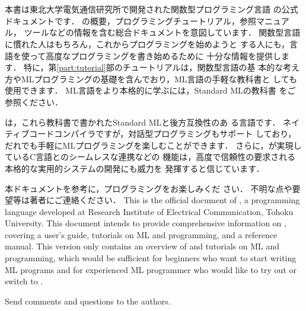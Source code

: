 \part{}
\label{part:outline}

\chapter{}

\ifjp%
	本書は東北大学電気通信研究所で開発された関数型プログラミング言語
\smlsharp{}の公式ドキュメントです．
	\smlsharp{}の概要，プログラミングチュートリアル，参照マニュアル，
ツールなどの情報を含む総合ドキュメントを意図しています．
	関数型言語に慣れた人はもちろん，これからプログラミングを始めようと
する人にも，\smlsharp{}言語を使って高度なプログラミングを書き始めるために
十分な情報を提供します．
	特に，第\ref{part:tutorial}部のチュートリアルは，関数型言語の基
本的な考え方やMLプログラミングの基礎を含んでおり，ML言語の手軽な教科書と
しても使用できます．
	ML言語をより本格的に学ぶには，Standard MLの教科書
\cite{ohori00sml}をご参照ください．
  
	\smlsharp{}は，これら教科書で書かれたStandard MLと後方互換性のあ
る言語です．
	ネイティブコードコンパイラですが，対話型プログラミングもサポート
しており，だれでも手軽にMLプログラミングを楽しむことができます．
	さらに，\smlsharp{}が実現しているC言語とのシームレスな連携などの
機能は，高度で信頼性の要求される本格的な実用的システムの開発にも威力を
発揮すると信じています． 
  
	本ドキュメントを参考に，\smlsharp{}プログラミングをお楽しみくだ
さい． 
	不明な点や要望等は著者にご連絡ください．
\else%
	This is the official document of \smlsharp{}, a programming
language developed at Research Institute of Electrical Communication,
Tohoku University.
	This document intends to provide comprehensive information on
\smlsharp{}, covering a user's guide, tutorials on ML and \smlsharp{}
programming, and a reference manual.
	This \version{} version only contains an overview of \smlsharp{}
and tutorials on ML and \smlsharp{} programming, which would be
sufficient for beginners who want to start writing ML programs and
for experienced ML programmer who would like to try out or switch to
\smlsharp{}.

	Send comments and questions to the authors.
\fi%

